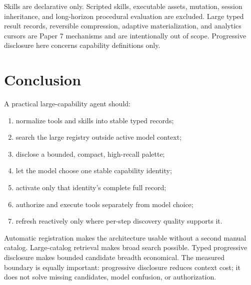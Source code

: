 \documentclass[11pt]{article}
\begin{document}
Skills are declarative only. Scripted skills, executable assets, mutation,
session inheritance, and long-horizon procedural evaluation are excluded.
Large typed result records, reversible compression, adaptive materialization,
and analytics cursors are Paper 7 mechanisms and are intentionally out of
scope. Progressive disclosure here concerns capability definitions only.

\section{Conclusion}

A practical large-capability agent should:
\begin{enumerate}[leftmargin=*,nosep]
  \item normalize tools and skills into stable typed records;
  \item search the large registry outside active model context;
  \item disclose a bounded, compact, high-recall palette;
  \item let the model choose one stable capability identity;
  \item activate only that identity's complete full record;
  \item authorize and execute tools separately from model choice;
  \item refresh reactively only where per-step discovery quality supports it.
\end{enumerate}

Automatic registration makes the architecture usable without a second manual
catalog. Large-catalog retrieval makes broad search possible. Typed progressive
disclosure makes bounded candidate breadth economical. The measured boundary
is equally important: progressive disclosure reduces context cost; it does not
solve missing candidates, model confusion, or authorization.

\appendix
\clearpage

\end{document}
